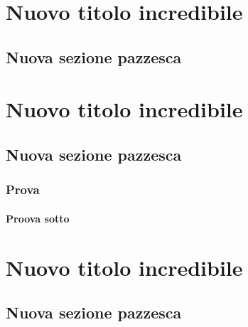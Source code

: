 \documentclass[a4paper, 11pt, openright, twoside]{report}
\begin{document}
\tableofcontents
\chapter[Nuovo titolo incredibile]{Nuovo titolo incredibile}
\label{chap:Nuovo titolo incredibile}

\lipsum[1]

\section[Nuova sezione pazzesca]{Nuova sezione pazzesca}
\label{chap:Nuova sezione pazzesca}

\lipsum[1-2]


\chapter[Nuovo titolo incredibile]{Nuovo titolo incredibile}
\label{chap:Nuovo titolo incredibile}

\lipsum[1]

\section[Nuova sezione pazzesca]{Nuova sezione pazzesca}
\label{chap:Nuova sezione pazzesca}

\subsection[Prova]{Prova}
\label{chap:Prova}

\subsubsection[Proova sotto]{Proova sotto}
\label{chap:Proova sotto}



\lipsum[1-9]

\chapter[Nuovo titolo incredibile]{Nuovo titolo incredibile}
\label{chap:Nuovo titolo incredibile}

\lipsum[1]

\section[Nuova sezione pazzesca]{Nuova sezione pazzesca}
\label{chap:Nuova sezione pazzesca}
\end{document}
